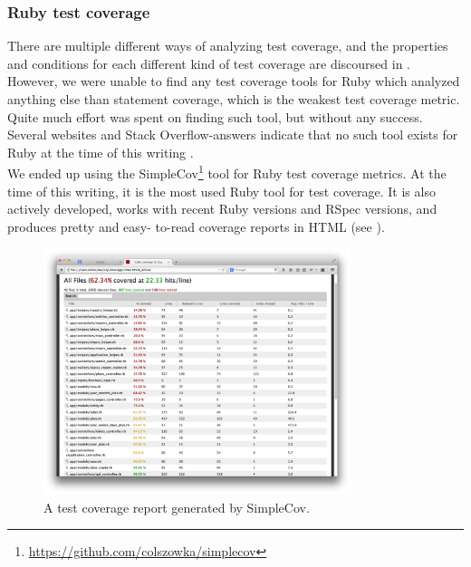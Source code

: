 \label{sec:coverage_frameworks}

\subsubsection{Ruby test coverage}
There are multiple different ways of analyzing test coverage, and the
properties and conditions for each different kind of test coverage are
discoursed in . However, we were unable to find any
test coverage tools for Ruby which analyzed anything else than statement
coverage, which is the weakest test coverage metric. Quite much effort
was spent on finding such tool, but without any success. Several
websites and Stack Overflow-answers indicate that no such tool exists
for Ruby at the time of this writing \cite{web:coverage_ruby19,
so:c1c2_coverage, so:c1_coverage, web:toolbox_code_metrics}.\\

We ended up using the
SimpleCov\footnote{\url{https://github.com/colszowka/simplecov}} tool
for Ruby test coverage metrics. At the time of this writing, it is the
most used Ruby tool for test coverage. It is also actively developed,
works with recent Ruby versions and RSpec versions, and produces pretty
and easy- to-read coverage reports in HTML (see
). \cite{web:toolbox_code_metrics}\\

\begin{figure}
\centering
\includegraphics[width=0.8\textwidth]{results/choices/simplecov}
\caption{A test coverage report generated by SimpleCov.}
\label{fig:simplecov_report}
\end{figure}


